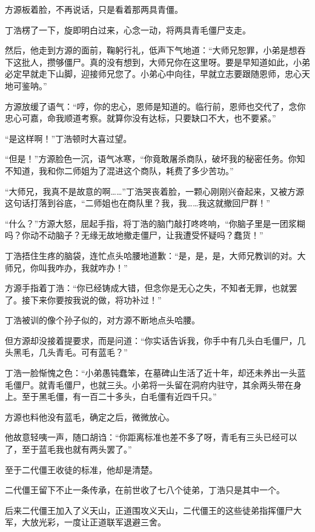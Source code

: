 \begin{this_body}
方源板着脸，不再说话，只是看着那两具青僵。

丁浩楞了一下，旋即明白过来，心念一动，将两具青毛僵尸支走。

然后，他走到方源的面前，鞠躬行礼，低声下气地道：“大师兄恕罪，小弟是想吞下这批人，攒够僵尸。真的没有想到，大师兄你在这里呀。要是早知道如此，小弟必定早就走下山脚，迎接师兄您了。小弟心中向往，早就立志要跟随恩师，忠心天地可鉴呐。”

方源放缓了语气：“哼，你的忠心，恩师是知道的。临行前，恩师也交代了，念你忠心可嘉，命我顺道考察。就算你没有达标，只要缺口不大，也不要紧。”

“是这样啊！”丁浩顿时大喜过望。

“但是！”方源脸色一沉，语气冰寒，“你竟敢屠杀商队，破坏我的秘密任务。你知不知道，我和你二师姐为了混进这个商队，耗费了多少苦功。”

“大师兄，我真不是故意的啊……”丁浩哭丧着脸，一颗心刚刚兴奋起来，又被方源这句话打落到谷底，“二师姐也在商队里？我，我……我这就撤回尸群！”

“什么？”方源大怒，屈起手指，将丁浩的脑门敲打咚咚响，“你脑子里是一团浆糊吗？你动不动脑子？无缘无故地撤走僵尸，让我遭受怀疑吗？蠢货！”

丁浩捂住生疼的脑袋，连忙点头哈腰地道歉：“是，是，是，大师兄教训的对。大师兄，你叫我咋办，我就咋办！”

方源手指着丁浩：“你已经铸成大错，但念你是无心之失，不知者无罪，也就罢了。接下来你要按我说的做，将功补过！”

丁浩被训的像个孙子似的，对方源不断地点头哈腰。

但方源却没接着提要求，而是问道：“你实话告诉我，你手中有几头白毛僵尸，几头黑毛，几头青毛。可有蓝毛？”

丁浩一脸惭愧之色：“小弟愚钝蠢笨，在墓碑山生活了近十年，却还未养出一头蓝毛僵尸。就青毛僵尸，也就三头。小弟将一头留在洞府内驻守，其余两头带在身上。至于黑毛僵，有一百二十多头，白毛僵有近四千只。”

方源也料他没有蓝毛，确定之后，微微放心。

他故意轻咦一声，随口胡诌：“你距离标准也差不多了呀，青毛有三头已经可以了，至于蓝毛我也就有两头罢了。”

至于二代僵王收徒的标准，他却是清楚。

二代僵王留下不止一条传承，在前世收了七八个徒弟，丁浩只是其中一个。

后来二代僵王加入了义天山，正道围攻义天山，二代僵王的这些徒弟指挥僵尸大军，大放光彩，一度让正道联军退避三舍。


\end{this_body}
